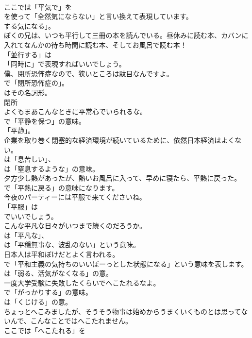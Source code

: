 \documentclass[8pt]{extreport}
\begin{document}
\begin{CJK}{UTF8}{min}
\\	ここでは「平気で」を
\\	を使って「全然気にならない」と言い換えて表現しています。
\\	する気になる」。	
\\	ぼくの兄は、いつも平行して三冊の本を読んでいる。昼休みに読む本、カバンに入れてなんかの待ち時間に読む本、そしてお風呂で読む本！ 
\\	「並行する」は
\\	「同時に」で表現すればいいでしょう。	
\\	僕、閉所恐怖症なので、狭いところは駄目なんですよ。 
\\	で「閉所恐怖症の」。
\\	はその名詞形。	
\\	閉所
\\	よくもまあこんなときに平常心でいられるな。 
\\	で「平静を保つ」の意味。
\\	「平静」。	
\\	企業を取り巻く閉塞的な経済環境が続いているために、依然日本経済はよくない。 
\\	は「息苦しい」、
\\	は「窒息するような」の意味。	
\\	夕方少し熱があったが、熱いお風呂に入って、早めに寝たら、平熱に戻った。 
\\	で「平熱に戻る」の意味になります。	
\\	今夜のパーティーには平服で来てくださいね。 
\\	「平服」は
\\	でいいでしょう。	
\\	こんな平凡な日々がいつまで続くのだろうか。 
\\	は「平凡な」、
\\	は「平穏無事な、波乱のない」という意味。	
\\	日本人は平和ぼけだとよく言われる。 
\\	で「平和主義の気持ちのいいぼーっとした状態になる」という意味を表します。
\\	は「弱る、活気がなくなる」の意。	
\\	一度大学受験に失敗したくらいでへこたれるなよ。 
\\	で「がっかりする」の意味。
\\	は「くじける」の意。	
\\	ちょっとへこみましたが、そうそう物事は始めからうまくいくものとは思ってないんで、こんなことではへこたれません。 
\\	ここでは「へこたれる」を 

\end{CJK}
\end{document}
